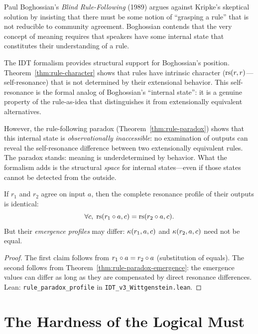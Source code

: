\begin{interpretation}
Paul Boghossian's \textit{Blind Rule-Following} (1989) argues against
Kripke's skeptical solution by insisting that there must be some notion of
``grasping a rule'' that is not reducible to community agreement. Boghossian
contends that the very concept of meaning requires that speakers have some
internal state that constitutes their understanding of a rule.

The IDT formalism provides structural support for Boghossian's position.
Theorem~\ref{thm:rule-character} shows that rules have intrinsic character
($\mathrm{rs}(r, r)$---self-resonance) that is not determined by their extensional
behavior. This self-resonance is the formal analog of Boghossian's ``internal
state'': it is a genuine property of the rule-as-idea that distinguishes
it from extensionally equivalent alternatives.

However, the rule-following paradox (Theorem~\ref{thm:rule-paradox}) shows
that this internal state is \emph{observationally inaccessible}: no examination
of outputs can reveal the self-resonance difference between two extensionally
equivalent rules. The paradox stands: meaning is underdetermined by behavior.
What the formalism adds is the structural \emph{space} for internal states---even
if those states cannot be detected from the outside.
\end{interpretation}

\begin{theorem}
\label{thm:rule-profile}
If $r_1$ and $r_2$ agree on input $a$, then the complete resonance profile
of their outputs is identical:
\[
\forall c,\; \mathrm{rs}(r_1 \circ a, c) = \mathrm{rs}(r_2 \circ a, c).
\]
But their \emph{emergence profiles} may differ:
$\kappa(r_1, a, c)$ and $\kappa(r_2, a, c)$ need not be equal.
\end{theorem}

\begin{proof}
The first claim follows from $r_1 \circ a = r_2 \circ a$ (substitution
of equals). The second follows from Theorem~\ref{thm:rule-paradox-emergence}:
the emergence values can differ as long as they are compensated by direct
resonance differences.
Lean: \texttt{rule\_paradox\_profile} in \texttt{IDT\_v3\_Wittgenstein.lean}.
\end{proof}

\section{The Hardness of the Logical Must}

